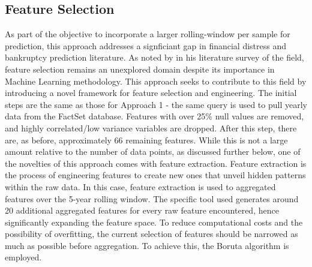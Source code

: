 \documentclass[a4paper]{report}
\begin{document}
\subsection{Feature Selection}
As part of the objective to incorporate a larger rolling-window per sample for prediction, this approach addresses a signficiant gap in financial distress and 
bankruptcy prediction literature. As noted by \cite{zhao2024survey} in his literature survey of the field, feature selection remains an unexplored domain despite 
its importance in Machine Learning methodology. This approach seeks to contribute to this field by introducing a novel framework for feature selection and engineering.
The initial steps are the same as those for Approach 1 - the same query is used to pull yearly data from the FactSet database. Features 
with over 25\% null values are removed, and highly correlated/low variance variables are dropped. After this step, there are, as before, approximately 66 remaining features.
While this is not a large amount relative to the number of data points, as discussed further below,
one of the novelties of this approach comes with feature extraction. Feature extraction is the process of engineering features to create new ones that unveil hidden patterns 
within the raw data. In this case, feature extraction is used to aggregated features over the 5-year rolling window. The specific tool used generates around 20 additional aggregated features 
for every raw feature encountered, hence significantly expanding the feature space. To reduce computational costs and the possibility of overfitting, the current 
selection of features should be narrowed as much as possible before aggregation. To achieve this, the Boruta algorithm is employed.
\end{document}
